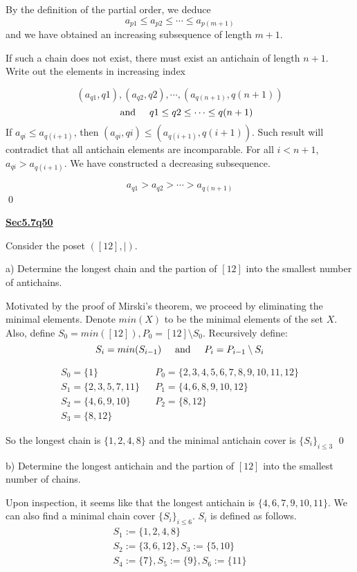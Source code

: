\documentclass{article}
\newcommand{\new}[1]{
    \vspace{2mm}
    \noindent
    \textbf{
    \underline{#1}}
}
\newcommand{\textAnd}{
    {
        \hspace{5mm}
        \textrm{and}
        \hspace{5mm}
    }
}
\begin{document}
By the definition of the partial order, we deduce 
\[
    a_{p1} \leq a_{p2} \leq \cdots \leq a_{p(m+1)}
\]
and we have obtained an increasing subsequence of length $m + 1$. 

If such a chain does not exist, there must exist an antichain 
of length $n + 1$. Write out the elements in increasing index

\[
    (a_{q1}, q1) , (a_{q2}, q2) , \cdots , (a_{q(n+1)}, q(n+1))
\]
\[
    \textAnd 
    q1 \leq q2 \leq \cdots \leq q(n+1)
\]
If $a_{qi} \leq a_{q(i + 1)}$, then $(a_{qi}, qi) \leq (a_{q(i + 1)}, q(i + 1))$. 
Such result will contradict that all antichain elements are incomparable. 
For all $i < n + 1$,  $a_{qi} > a_{q(i + 1)}$. We have constructed
a decreasing subsequence. 

\[
    a_{q1} > a_{q2} > \cdots > a_{q(n + 1)}
\]
\hfill \qed


\new{Sec5.7q50} 
Consider the poset $([12], |)$. 

a) Determine the longest chain 
and the partion of $[12]$ into the smallest number of antichains. 

Motivated by the proof of Mirski's theorem, we proceed by eliminating 
the minimal elements. Denote $min(X)$ to be the minimal elements 
of the set $X$. Also, define $S_0 = min([12]), P_0 = [12] \setminus S_0$. 
Recursively define:
\[
    S_i = min(S_{i - 1}) 
    \textAnd 
    P_i = P_{i - 1} \setminus S_i 
\]

\begin{align*}
    S_0 = \{1\} & & P_0 = \{2, 3, 4, 5, 6, 7, 8, 9, 10, 11, 12\}\\
    S_1 = \{2, 3, 5, 7, 11\} & & P_1 = \{4, 6, 8, 9, 10, 12\} \\ 
    S_2 = \{4, 6, 9, 10\} & & P_2 = \{8, 12\}\\
    S_3 = \{8, 12\}
\end{align*}

So the longest chain is $\{1, 2, 4, 8\}$ and the minimal antichain 
cover is $\{S_i\}_{i \leq 3}$ \hfil\qed

b) Determine the longest antichain 
and the partion of $[12]$ into the smallest number of chains. 

Upon inspection, it seems like that the longest antichain is 
$\{4,6,7,9,10,11\}$. We can also find a minimal chain cover 
$\{S_i\}_{i \leq 6}$. $S_i$ is defined as follows. 
\[
\begin{split}
    S_1 := \{1, 2, 4, 8\}\\
    S_2 := \{3, 6, 12\}, S_3 := \{5, 10\}\\
    S_4 := \{7\}, S_5 := \{9\}, S_6 := \{11\}
\end{split}
\]
\end{document}
